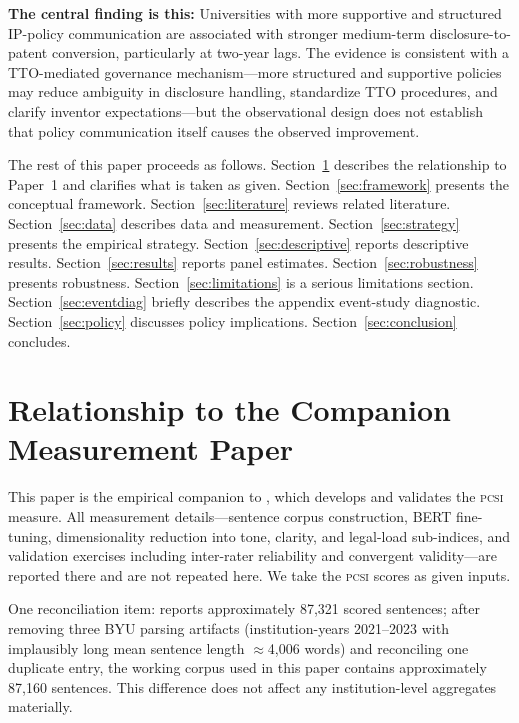 \documentclass[12pt]{article}
\newcommand{\PCSI}{\textsc{pcsi}}
\begin{document}
\textbf{The central finding is this:} Universities with more supportive and structured
IP-policy communication are associated with stronger medium-term disclosure-to-patent
conversion, particularly at two-year lags. The evidence is consistent with a TTO-mediated
governance mechanism---more structured and supportive policies may reduce ambiguity in
disclosure handling, standardize TTO procedures, and clarify inventor expectations---but
the observational design does not establish that policy communication itself causes the
observed improvement.

The rest of this paper proceeds as follows. Section~\ref{sec:paper1} describes the
relationship to Paper~1 and clarifies what is taken as given. Section~\ref{sec:framework}
presents the conceptual framework. Section~\ref{sec:literature} reviews related literature.
Section~\ref{sec:data} describes data and measurement. Section~\ref{sec:strategy} presents
the empirical strategy. Section~\ref{sec:descriptive} reports descriptive results.
Section~\ref{sec:results} reports panel estimates. Section~\ref{sec:robustness} presents
robustness. Section~\ref{sec:limitations} is a serious limitations section. Section~\ref{sec:eventdiag}
briefly describes the appendix event-study diagnostic. Section~\ref{sec:policy} discusses
policy implications. Section~\ref{sec:conclusion} concludes.

\section{Relationship to the Companion Measurement Paper}
\label{sec:paper1}

This paper is the empirical companion to \citet{sharma2026pcsi}, which develops and
validates the \PCSI{} measure. All measurement details---sentence corpus construction,
BERT fine-tuning, dimensionality reduction into tone, clarity, and legal-load sub-indices,
and validation exercises including inter-rater reliability and convergent validity---are
reported there and are not repeated here. We take the \PCSI{} scores as given inputs.

One reconciliation item: \citet{sharma2026pcsi} reports approximately 87,321 scored
sentences; after removing three BYU parsing artifacts (institution-years 2021--2023 with
implausibly long mean sentence length $\approx$4,006 words) and reconciling one duplicate
entry, the working corpus used in this paper contains approximately 87,160 sentences.
This difference does not affect any institution-level aggregates materially.
\end{document}
